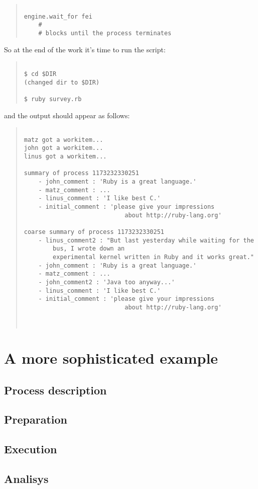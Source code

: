         \begin{quote}
        \begin{verbatim}

engine.wait_for fei
    #
    # blocks until the process terminates

        \end{verbatim}
        \end{quote}


        So at the end of the work it's time to run the script:

        \begin{quote}
        \begin{verbatim}

$ cd $DIR
(changed dir to $DIR)

$ ruby survey.rb

        \end{verbatim}
        \end{quote}

        and the output should appear as follows:

        \begin{quote}
        \begin{verbatim}

matz got a workitem...
john got a workitem...
linus got a workitem...

summary of process 1173232330251
    - john_comment : 'Ruby is a great language.'
    - matz_comment : ...
    - linus_comment : 'I like best C.'
    - initial_comment : 'please give your impressions 
                            about http://ruby-lang.org'

coarse summary of process 1173232330251
    - linus_comment2 : "But last yesterday while waiting for the 
        bus, I wrote down an 
        experimental kernel written in Ruby and it works great."
    - john_comment : 'Ruby is a great language.'
    - matz_comment : ...
    - john_comment2 : 'Java too anyway...'
    - linus_comment : 'I like best C.'
    - initial_comment : 'please give your impressions 
                            about http://ruby-lang.org'



\end{verbatim}
\end{quote}









\section{A more sophisticated example}

    \subsection{Process description}

    \subsection{Preparation}

    \subsection{Execution}

    \subsection{Analisys}
